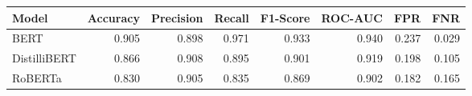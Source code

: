 \begin{tabular}{|l||r|r|r|r|r|r|r|}
\toprule
Model & \textbf{Accuracy} & \textbf{Precision} & Recall & \textbf{F1-Score} & \textbf{ROC-AUC} & \textbf{FPR} & FNR \\
\midrule \midrule
BERT & 0.905 & 0.898 & 0.971 & 0.933 & 0.940 & 0.237 & 0.029 \\
DistilliBERT & 0.866 & 0.908 & 0.895 & 0.901 & 0.919 & 0.198 & 0.105 \\
RoBERTa & 0.830 & 0.905 & 0.835 & 0.869 & 0.902 & 0.182 & 0.165 \\
\bottomrule
\end{tabular}
